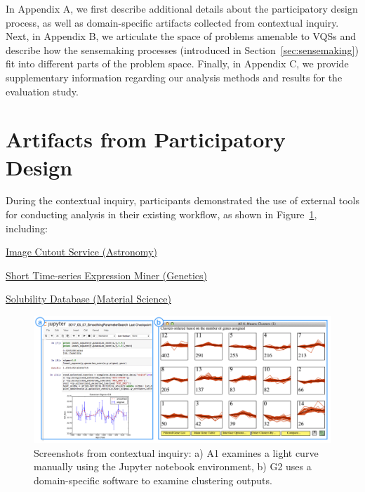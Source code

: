  \appendix
 \npar In Appendix A, we first describe additional details about the participatory design process, as well as domain-specific artifacts collected from contextual inquiry. Next, in Appendix B, we articulate the space of problems amenable to VQSs and describe how the sensemaking processes (introduced in Section~\ref{sec:sensemaking}) fit into different parts of the problem space. Finally, in Appendix C, we provide supplementary information regarding our analysis methods and results for the evaluation study.
 \section{Artifacts from Participatory Design\label{apdx:pdartifact}}
 \npar During the contextual inquiry, participants demonstrated the use of external tools for conducting analysis in their existing workflow, as shown in Figure~\ref{workflow}, including:
   \begin{denselist}
     \item \href{http://descut.cosmology.illinois.edu}{Image Cutout Service (Astronomy)}
     \item \href{http://cs.cmu.edu/~jernst/stem/}{Short Time-series Expression Miner (Genetics)}
     \item \href{http://srdata.nist.gov/solubility/}{Solubility Database (Material Science)}
   \end{denselist}
 \begin{figure}[h!]
   \centering
   \includegraphics[width=0.9\linewidth]{figures/workflow.png}
   \caption{Screenshots from contextual inquiry: a) A1 examines a light curve manually using the Jupyter notebook environment, b) G2 uses a domain-specific software to examine clustering outputs.}
   \label{workflow}
 \end{figure}
